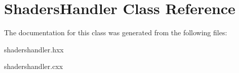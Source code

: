 \hypertarget{classShadersHandler}{\section{Shaders\-Handler Class Reference}
\label{classShadersHandler}
}


The documentation for this class was generated from the following files\-:\begin{DoxyCompactItemize}
\item 
shadershandler.\-hxx\item 
shadershandler.\-cxx\end{DoxyCompactItemize}
